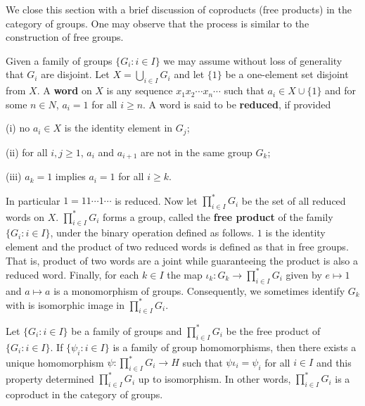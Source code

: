 We close this section with a brief discussion of coproducts (free products) in the category of groups. One may observe that the process is similar to the construction of free groups.\par
Given a family of groups $\{G_i:i\in I\}$ we may assume without loss of generality that $G_i$ are disjoint. Let $X=\bigcup_{i\in I}G_i$ and let $\{1\}$ be a one-element set disjoint from $X$. A \textbf{word} on $X$ is any sequence $x_1x_2\cdots x_n\cdots$ such that $a_i\in X\cup\{1\}$ and for some $n\in N$, $a_i=1$ for all $i\ge n$. A word is said to be \textbf{reduced}, if provided\par
(i) no $a_i\in X$ is the identity element in $G_j$;\par
(ii) for all $i,j\ge 1$, $a_i$ and $a_{i+1}$ are not in the same group $G_k$;\par
(iii) $a_k=1$ implies $a_i=1$ for all $i\ge k$.\par
In particular $1=11\cdots 1\cdots$ is reduced. Now let ${\prod}^*_{i\in I}G_i$ be the set of all reduced words on $X$. ${\prod}^*_{i\in I}G_i$ forms a group, called the \textbf{free product} of the family $\{G_i:i\in I\}$, under the binary operation defined as follows. $1$ is the identity element and the product of two reduced words is defined as that in free groups. That is, product of two words are a joint while guaranteeing the product is also a reduced word. Finally, for each $k\in I$ the map $\iota_k:G_k\to{\prod}^*_{i\in I}G_i$ given by $e\mapsto 1$ and $a\mapsto a$ is a monomorphism of groups. Consequently, we sometimes identify $G_k$ with is isomorphic image in ${\prod}^*_{i\in I}G_i$.
\begin{theorem}
Let $\{G_i:i\in I\}$ be a family of groups and ${\prod}^*_{i\in I}G_i$ be the free product of $\{G_i:i\in I\}$. If $\{\psi_i:i\in I\}$ is a family of group homomorphisms, then there exists a unique homomorphism $\psi:{\prod}^*_{i\in I}G_i\to H$ such that $\psi\iota_i=\psi_i$ for all $i\in I$ and this property determined ${\prod}^*_{i\in I}G_i$ up to isomorphism. In other words, ${\prod}^*_{i\in I}G_i$ is a coproduct in the category of groups.
\end{theorem}
